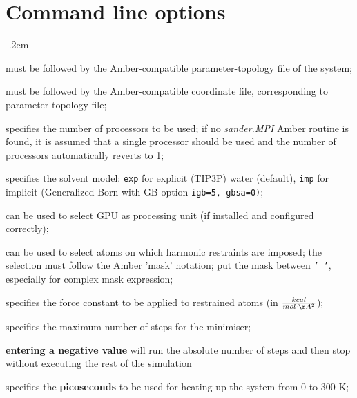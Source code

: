 \documentclass[10pt,landscape,twocolumn]{article}
\begin{document}
\section{Command line options}
\begin{description}
\itemsep-.2em 

\item[\textbf{\texttt{-p, --prm}}]  must be followed by the Amber-compatible parameter-topology file of the system;

\item[\textbf{\texttt{-c, --crd}}]  must be followed by the Amber-compatible coordinate file, corresponding to parameter-topology file;

\item[\textbf{\texttt{-n, --np}}] specifies the number of processors to be used; if no \textsl{sander.MPI} Amber routine is found, it is assumed that a single processor should be used and the number of processors automatically reverts to 1;

\item[\textbf{\texttt{--solv}}] specifies the solvent model: \texttt{exp} for explicit (TIP3P) water (default), \texttt{imp} for implicit (Generalized-Born with GB option \texttt{igb=5, gbsa=0)};

\item[\textbf{\texttt{--cuda}}] can be used to select GPU as processing unit (if installed and configured correctly);

\item[\textbf{\texttt{--mask }}] can be used to select atoms on which harmonic restraints are imposed; the selection must follow the Amber 'mask' notation; put the mask between \texttt{'\ '}, especially for complex mask expression;

\item[\textbf{\texttt{--force}}] specifies the force constant to be applied to restrained atoms (in $kcal \over {mol \cdot \AA^2} $);
\newpage
\item[\textbf{\texttt{--ms}}] specifies the maximum number of steps for the minimiser; \begin{mdframed}\textbf{entering a negative value} will run the absolute number of steps and then stop without executing the rest of the simulation\end{mdframed}

\item[\textbf{\texttt{--hs}}] specifies the \textbf{picoseconds} to be used for heating up the system from 0 to 300 K;


\end{description}
\end{document}
